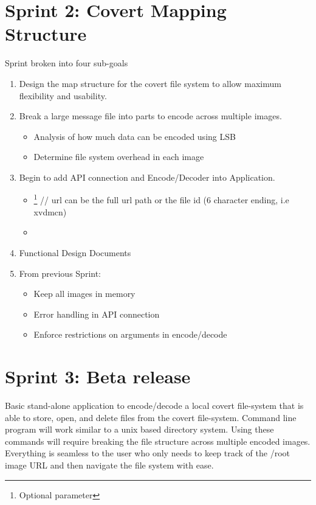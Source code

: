 \documentclass[letterpaper,10pt,english]{sphinxmanual}
\begin{document}
\section{Sprint 2: Covert Mapping Structure}
\label{index:sprint-2-covert-mapping-structure}
Sprint broken into four sub-goals
\begin{enumerate}
\item {} 
Design the map structure for the covert file system to allow maximum flexibility and usability.

\item {} 
Break a large message file into parts to encode across multiple images.
\begin{itemize}
\item {} 
Analysis of how much data can be encoded using LSB

\item {} 
Determine file system overhead in each image

\end{itemize}

\item {} 
Begin to add API connection and Encode/Decoder into Application.
\begin{itemize}
\item {} 
 \footnote[1]{
Optional parameter
} // url can be the full url path or the file id (6 character ending, i.e xvdmcn)

\item {} 

\end{itemize}

\item {} 
Functional Design Documents

\item {} 
From previous Sprint:
\begin{itemize}
\item {} 
Keep all images in memory

\item {} 
Error handling in API connection

\item {} 
Enforce restrictions on arguments in encode/decode

\end{itemize}

\end{enumerate}


\section{Sprint 3: Beta release}
\label{index:sprint-3-beta-release}
Basic stand-alone application to encode/decode a local covert file-system that is able to store, open, and delete files from the covert file-system. Command line program will work similar to a unix based directory system. Using these commands will require breaking the file structure across multiple encoded images. Everything is seamless to the user who only needs to keep track of the /root image URL and then navigate the file system with ease.
\end{document}
